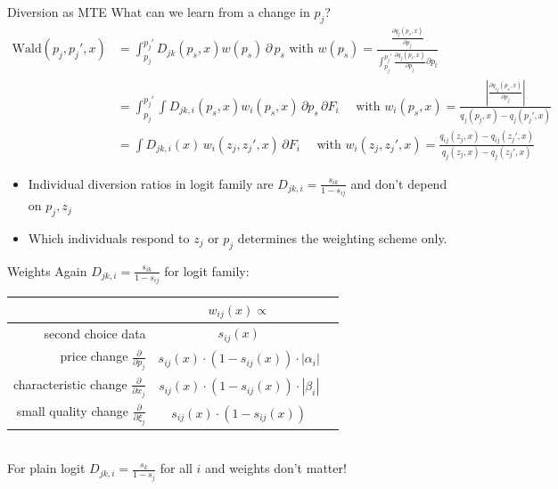 \documentclass[xcolor=pdftex,dvipsnames,table,mathserif,aspectratio=169]{beamer}
\begin{document}
\begin{frame}{Diversion as MTE}
\footnotesize
What can we learn from a change in $p_j$?
\begin{align*}
\text{Wald}(p_j, p_j',x)
&=\int_{p_j}^{p_j'} D_{jk}(p_s,x) w(p_s) \, \partial \, p_s \mbox{ with }
w(p_s)=\frac{  \frac{\partial q_j(p_s,x)}{\partial p_j} }{\int_{p_j}^{p_j'}  \frac{\partial q_j(p_t,x)}{\partial p_j} \partial p_t} \\
\nonumber &=\int_{p_j}^{p_j'} \int D_{jk,i}(p_s,x)  w_i(p_s,x) \, \partial p_s  \, \partial F_i \quad \mbox{ with } w_i(p_s,x) = \frac{\left| \frac{\partial q_{ij}(p_s,x)}{\partial p_j} \right|}{q_j(p_j,x)- q_j(p_j',x)}\\
&= \int D_{jk,i}(x) \, w_i(z_j,z_j',x)  \, \partial F_i \quad \mbox{ with } w_i(z_j,z_j',x) = \frac{q_{ij}(z_j,x)- q_{ij}(z_j',x) }{q_j(z_j,x)- q_j(z_j',x)}
\end{align*}
\begin{itemize}
\item Individual diversion ratios in logit family are $D_{jk,i} = \frac{s_{ik}}{1-s_{ij}}$ and don't depend on $p_j,z_j$
\item Which individuals respond to $z_j$ or $p_j$ determines the weighting scheme only.
\end{itemize}
\end{frame}

\begin{frame}{Weights}
Again $D_{jk,i} = \frac{s_{ik}}{1-s_{ij}}$ for logit family:\\
\begin{tabular}{rcc} 
& $w_{i j}(x) \propto$ \\
\midrule second choice data & $s_{i j}(x)$ \\
price change $\frac{\partial}{\partial p_{j}}$ & $s_{i j}(x) \cdot\left(1-s_{i j}(x)\right) \cdot\left|\alpha_{i}\right|$ \\
characteristic change $\frac{\partial}{\partial x_{j}}$ & $s_{i j}(x) \cdot\left(1-s_{i j}(x)\right) \cdot\left|\beta_{i}\right|$ \\
small quality change $\frac{\partial}{\partial \xi_{j}}$ & $s_{i j}(x) \cdot\left(1-s_{i j}(x)\right)$ \\
\midrule
\end{tabular}\\
For plain logit $D_{jk,i} = \frac{s_{k}}{1-s_{j}}$ for all $i$ and weights don't matter!
\end{frame}
\end{document}
